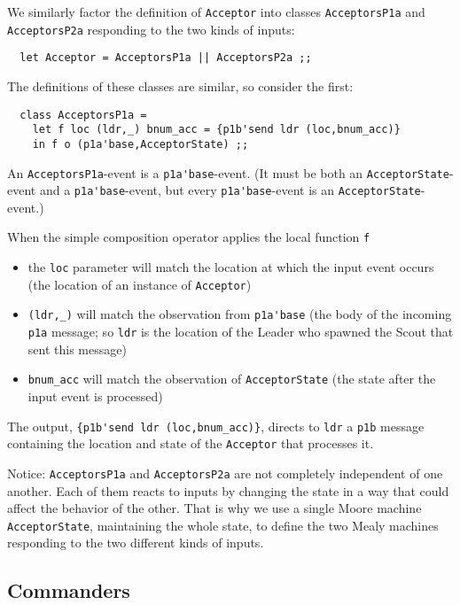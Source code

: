 \documentclass[final]{article}
\begin{document}
We similarly factor the definition of \lstinline{Acceptor} into
classes \lstinline{AcceptorsP1a} and \lstinline{AcceptorsP2a}
responding to the two kinds of inputs:
\begin{lstlisting}
  let Acceptor = AcceptorsP1a || AcceptorsP2a ;;
\end{lstlisting}

The definitions of these classes are similar, so consider the
first:
\begin{lstlisting}
  class AcceptorsP1a =
    let f loc (ldr,_) bnum_acc = {p1b'send ldr (loc,bnum_acc)}
    in f o (p1a'base,AcceptorState) ;;
\end{lstlisting}
An \lstinline{AcceptorsP1a}-event is a \lstinline{p1a'base}-event.
(It must be both an \lstinline{AcceptorState}-event and a
\lstinline{p1a'base}-event, but every \lstinline{p1a'base}-event is an
\lstinline{AcceptorState}-event.)

When the simple composition operator applies the local function
\lstinline{f}
\begin{itemize}
\item
the \lstinline{loc} parameter will match the location at which the
input event occurs (the location of an instance of
\lstinline{Acceptor})

\item
\lstinline{(ldr,_)} will match the observation from
\lstinline{p1a'base} (the body of the incoming \lstinline{p1a}
message; so \lstinline{ldr} is the location of the Leader who spawned
the Scout that sent this message)

\item
\lstinline{bnum_acc} will match the observation of
\lstinline{AcceptorState} (the state after the input event is processed)
\end{itemize}
The output, \lstinline!{p1b'send ldr (loc,bnum_acc)}!, directs to
\lstinline{ldr} a \lstinline{p1b} message containing the location
and state of the \lstinline{Acceptor} that processes it.

Notice: \lstinline{AcceptorsP1a} and \lstinline{AcceptorsP2a} are not
completely independent of one another.  Each of them reacts to inputs
by changing the state in a way that could affect the behavior of the
other.  That is why we use a single Moore machine
\lstinline{AcceptorState}, maintaining the whole state, to define the
two Mealy machines responding to the two different kinds of inputs.

\subsection{Commanders}
\end{document}
